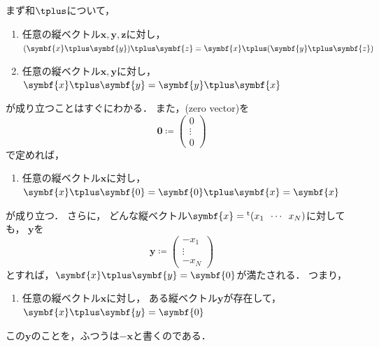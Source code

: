 \documentclass[
]{sotsu}
\newcommand{\fire}[1]{\textcolor{fire}{#1}}
\newcommand{\water}[1]{\textcolor{water}{#1}}
\begin{document}
まず和$\vecplus$について，
\begin{enumerate}
    \item[\labelcref*{vector:sum-associative}] 
        \fire{任意の縦ベクトル$\symbf{x}, \symbf{y}, \symbf{z}$}に対し，
        $(\symbf{x} \vecplus \symbf{y}) \vecplus \symbf{z} = \symbf{x} \vecplus (\symbf{y} \vecplus \symbf{z})$
    \item[\labelcref*{vector:sum-commutative}] 
        \fire{任意の縦ベクトル$\symbf{x}, \symbf{y}$}に対し，
        $\symbf{x} \vecplus \symbf{y} = \symbf{y} \vecplus \symbf{x}$
\end{enumerate}
が成り立つことはすぐにわかる．
また，(zero vector)を
\begin{equation*}
    \symbf{0} \coloneq 
    \begin{pmatrix}
        0  \\  \vdots  \\  0
    \end{pmatrix}
\end{equation*}
で定めれば，
\begin{enumerate}
    \item[\labelcref*{vector:sum-zero}] 
        \fire{任意の縦ベクトル$\symbf{x}$}に対し，
        $\symbf{x} \vecplus \symbf{0} = \symbf{0} \vecplus \symbf{x} = \symbf{x}$
\end{enumerate}
が成り立つ．
さらに，
どんな縦ベクトル$\symbf{x} = \cvector{x_1 ; \cdots ; x_N}$に対しても，
$\symbf{y}$を
\begin{equation*}
    \symbf{y} \coloneq 
    \begin{pmatrix}
        -x_1  \\  \vdots  \\  -x_N
    \end{pmatrix}
\end{equation*}
とすれば，$\symbf{x} \vecplus \symbf{y} = \symbf{0}$が満たされる．
つまり，
\begin{enumerate}
    \item[\labelcref*{vector:sum-opposite}] 
        \fire{任意の縦ベクトル$\symbf{x}$}に対し，
        \water{ある縦ベクトル$\symbf{y}$}が存在して，
        $\symbf{x} \vecplus \symbf{y} = \symbf{0}$
\end{enumerate}
この$\symbf{y}$のことを，ふつうは$-\symbf{x}$と書くのである．
\end{document}
